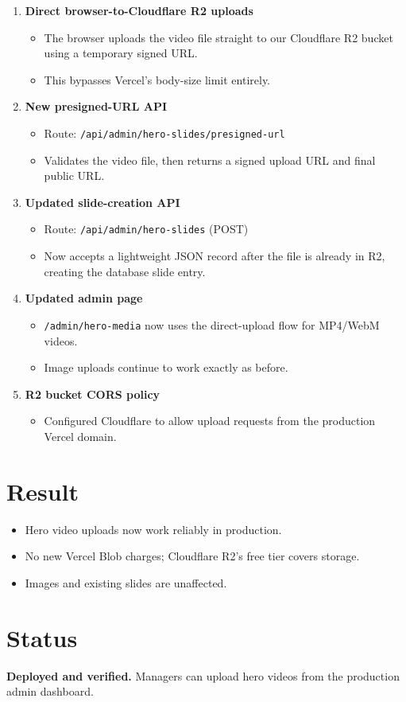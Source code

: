\documentclass[11pt]{article}
\begin{document}
\begin{enumerate}[leftmargin=*]
  \item \textbf{Direct browser-to-Cloudflare R2 uploads}
  \begin{itemize}
    \item The browser uploads the video file straight to our Cloudflare R2 bucket using a temporary signed URL.
    \item This bypasses Vercel's body-size limit entirely.
  \end{itemize}

  \item \textbf{New presigned-URL API}
  \begin{itemize}
    \item Route: \texttt{/api/admin/hero-slides/presigned-url}
    \item Validates the video file, then returns a signed upload URL and final public URL.
  \end{itemize}

  \item \textbf{Updated slide-creation API}
  \begin{itemize}
    \item Route: \texttt{/api/admin/hero-slides} (POST)
    \item Now accepts a lightweight JSON record after the file is already in R2, creating the database slide entry.
  \end{itemize}

  \item \textbf{Updated admin page}
  \begin{itemize}
    \item \texttt{/admin/hero-media} now uses the direct-upload flow for MP4/WebM videos.
    \item Image uploads continue to work exactly as before.
  \end{itemize}

  \item \textbf{R2 bucket CORS policy}
  \begin{itemize}
    \item Configured Cloudflare to allow upload requests from the production Vercel domain.
  \end{itemize}
\end{enumerate}

\section*{Result}
\begin{itemize}
  \item Hero video uploads now work reliably in production.
  \item No new Vercel Blob charges; Cloudflare R2's free tier covers storage.
  \item Images and existing slides are unaffected.
\end{itemize}

\section*{Status}
\textbf{Deployed and verified.} Managers can upload hero videos from the production admin dashboard.
\end{document}
